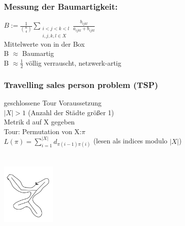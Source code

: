 \subsubsection{Messung der Baumartigkeit:}
$B:=\frac{1}{\binom{n}{4}} \displaystyle\sum_{\substack{i<j<k<l \\ i,j,k,l \in X}} \frac{b_{ijkl}}{a_{ijkl} + b_{ijkl}}$\\
Mittelwerte von in der Box\\
B $\approx$ Baumartig\\
B $\approx \frac{1}{2}$ völlig verrauscht, netzwerk-artig\\

\subsubsection{Travelling sales person problem (TSP)}
geschlossene Tour Voraussetzung\\
$|X|>1$ (Anzahl der Städte größer 1)\\
Metrik d auf X gegeben\\
Tour: Permutation von X:$\pi$\\
$L(\pi)=\displaystyle\sum_{i=1}^{|X|}d_{\pi(i-1)\pi(i)}$ (lesen als indices modulo $|X|$)
\\\\
\\
\includegraphics[width=0.2\textwidth]{lectures/161216/pix/6.jpg}\\


